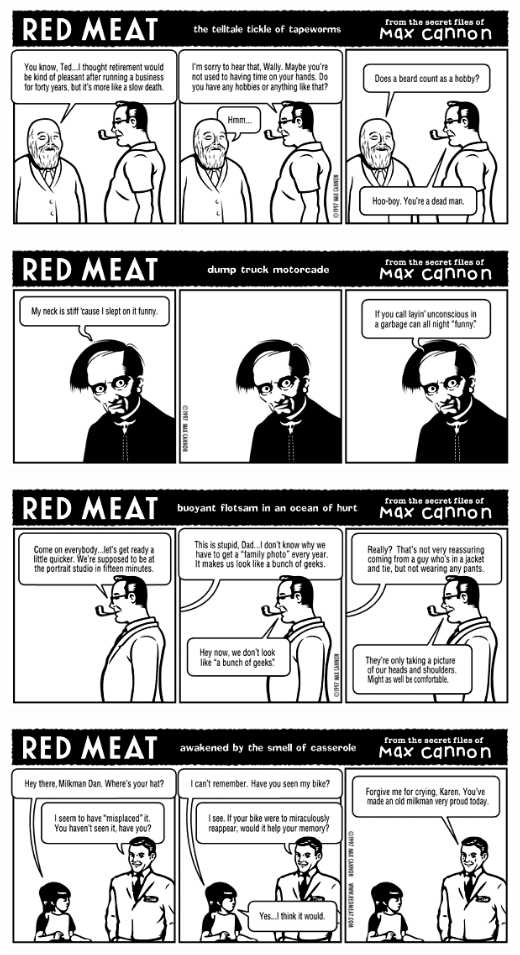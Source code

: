\documentclass[a4paper,twoside,11pt]{article}
\begin{document}
\includegraphics[width=\textwidth]{redmeat_1997-07-07.png}



\includegraphics[width=\textwidth]{redmeat_1997-07-14.png}



\includegraphics[width=\textwidth]{redmeat_1997-07-21.png}



\includegraphics[width=\textwidth]{redmeat_1997-07-28.png}
\end{document}
